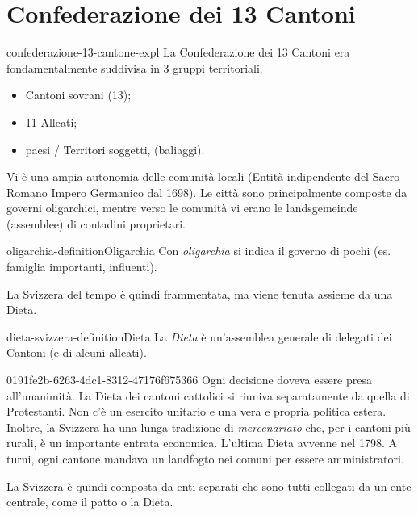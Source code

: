 \documentclass[preview]{standalone}
\begin{document}
\genpage

\section{Confederazione dei 13 Cantoni}

\begin{snippet}{confederazione-13-cantone-expl}
    La Confederazione dei 13 Cantoni era fondamentalmente suddivisa in 3 gruppi territoriali.
    \begin{itemize}
        \item Cantoni sovrani (13);
        \item 11 Alleati;
        \item paesi / Territori soggetti, (baliaggi).
    \end{itemize}

    Vi è una ampia autonomia delle comunità locali (Entità indipendente del Sacro Romano Impero Germanico dal 1698).
    Le città sono principalmente composte da governi oligarchici, mentre verso le comunità
    vi erano le landsgemeinde (assemblee) di contadini proprietari.
\end{snippet}

\begin{snippetdefinition}{oligarchia-definition}{Oligarchia}
    Con \textit{oligarchia} si indica il governo di pochi (es. famiglia importanti, influenti).
\end{snippetdefinition}

\begin{plainhtml}
    La Svizzera del tempo è quindi frammentata, ma viene tenuta assieme da una Dieta.
\end{plainhtml}

\begin{snippetdefinition}{dieta-svizzera-definition}{Dieta}
    La \textit{Dieta} è un'assemblea generale di delegati dei Cantoni (e di alcuni alleati).
\end{snippetdefinition}

\begin{snippet}{0191fe2b-6263-4dc1-8312-47176f675366}
    Ogni decisione doveva essere presa all'unanimità.
    La Dieta dei cantoni cattolici si riuniva separatamente da quella di Protestanti.
    Non c'è un esercito unitario e una vera e propria politica estera.
    Inoltre, la Svizzera ha una lunga tradizione di \textit{mercenariato} che, per i cantoni più rurali,
    è un importante entrata economica.
    L'ultima Dieta avvenne nel 1798.
    A turni, ogni cantone mandava un landfogto nei comuni per essere amministratori.
    
    La Svizzera è quindi composta da enti separati che sono tutti collegati da un ente centrale, come il patto o la Dieta.
\end{snippet}
\end{document}

